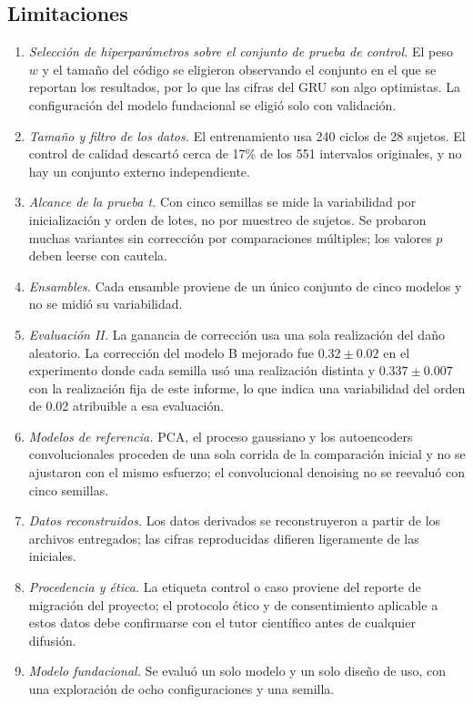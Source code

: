 \documentclass[11pt,a4paper]{amsart}
\begin{document}
\subsection{Limitaciones}

\begin{enumerate}
\item \textit{Selección de hiperparámetros sobre el conjunto de prueba de control.} El peso $w$ y el tamaño del código se eligieron observando el conjunto en el que se reportan los resultados, por lo que las cifras del GRU son algo optimistas. La configuración del modelo fundacional se eligió solo con validación.
\item \textit{Tamaño y filtro de los datos.} El entrenamiento usa 240 ciclos de 28 sujetos. El control de calidad descartó cerca de 17\% de los 551 intervalos originales, y no hay un conjunto externo independiente.
\item \textit{Alcance de la prueba t.} Con cinco semillas se mide la variabilidad por inicialización y orden de lotes, no por muestreo de sujetos. Se probaron muchas variantes sin corrección por comparaciones múltiples; los valores $p$ deben leerse con cautela.
\item \textit{Ensambles.} Cada ensamble proviene de un único conjunto de cinco modelos y no se midió su variabilidad.
\item \textit{Evaluación II.} La ganancia de corrección usa una sola realización del daño aleatorio. La corrección del modelo B mejorado fue $0.32\pm0.02$ en el experimento donde cada semilla usó una realización distinta y $0.337\pm0.007$ con la realización fija de este informe, lo que indica una variabilidad del orden de 0.02 atribuible a esa evaluación.
\item \textit{Modelos de referencia.} PCA, el proceso gaussiano y los autoencoders convolucionales proceden de una sola corrida de la comparación inicial y no se ajustaron con el mismo esfuerzo; el convolucional denoising no se reevaluó con cinco semillas.
\item \textit{Datos reconstruidos.} Los datos derivados se reconstruyeron a partir de los archivos entregados; las cifras reproducidas difieren ligeramente de las iniciales.
\item \textit{Procedencia y ética.} La etiqueta control o caso proviene del reporte de migración del proyecto; el protocolo ético y de consentimiento aplicable a estos datos debe confirmarse con el tutor científico antes de cualquier difusión.
\item \textit{Modelo fundacional.} Se evaluó un solo modelo y un solo diseño de uso, con una exploración de ocho configuraciones y una semilla.
\end{enumerate}
\end{document}
